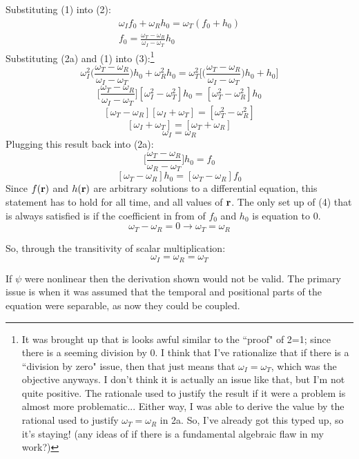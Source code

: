 \documentclass[12pt]{article}
\begin{document}
Substituting (1) into (2):
\begin{align*}
\tag{2a}
\omega_I f_0 + \omega_R h_0 = \omega_T (f_0 + h_0)\\
f_0 = \frac{\omega_T - \omega_R}{\omega_I - \omega_T}h_0
\end{align*}
Substituting (2a) and (1) into (3):\footnote{It was brought up that is looks awful similar to the ``proof" of 2=1; since there is a seeming division by 0. I think that I've rationalize that if there is a ``division by zero" issue, then that just means that $\omega_I = \omega_T$, which was the objective anyways. I don't think it is actually an issue like that, but I'm not quite positive. The rationale used to justify the result if it were a problem is almost more problematic... Either way, I was able to derive the value by the rational used to justify $\omega_T =\omega_R$ in 2a. So, I've already got this typed up, so it's staying! (any ideas of if there is a fundamental algebraic flaw in my work?)}
\[\omega_I^2 \Big(\frac{\omega_T - \omega_R}{\omega_I - \omega_T}\Big)h_0 + \omega_R^2 h_0 = \omega_T^2 \Big[\Big(\frac{\omega_T - \omega_R}{\omega_I - \omega_T}\Big)h_0 + h_0\Big]\]
\[\Big[\frac{\omega_T - \omega_R}{\omega_I - \omega_T}\Big][\omega_I^2 - \omega_T^2]h_0 = [\omega_T^2 - \omega_R^2]h_0\]
\[[\omega_T - \omega_R][\omega_I + \omega_T] = [\omega_T^2 - \omega_R^2]\]
\[[\omega_I + \omega_T]=[\omega_T + \omega_R]\]
\[\omega_I = \omega_R\]
Plugging this result back into (2a):
\[\Big[\frac{\omega_T - \omega_R}{\omega_R - \omega_T}\Big]h_0 = f_0\]
\begin{equation}
\tag{4}
[\omega_T - \omega_R]h_0 = [\omega_T - \omega_R]f_0
\end{equation}
Since $f(\vb{r})$ and $h(\vb{r})$ are arbitrary solutions to a differential equation, this statement has to hold for all time, and all values of $\vb{r}$. The only set up of (4) that is always satisfied is if the coefficient in from of $f_0$ and $h_0$ is equation to 0. 
\[\omega_T - \omega_R = 0 \rightarrow \omega_T = \omega_R\]

So, through the transitivity of scalar multiplication:
\[\boxed{\omega_I = \omega_R = \omega_T}\]\bigskip

If $\psi$ were nonlinear then the derivation shown would not be valid. The primary issue is when it was assumed that the temporal and positional parts of the equation were separable, as now they could be coupled. 
\end{document}
